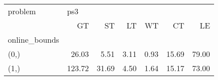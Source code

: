 \begin{tabular}{lrrrrrr}
\toprule
problem & \multicolumn{6}{l}{ps3} \\
{} &     GT &    ST &   LT &   WT &    CT &    LE \\
online\_bounds &        &       &      &      &       &       \\
\midrule
(0,)          &  26.03 &  5.51 & 3.11 & 0.93 & 15.69 & 79.00 \\
(1,)          & 123.72 & 31.69 & 4.50 & 1.64 & 15.17 & 73.00 \\
\bottomrule
\end{tabular}
